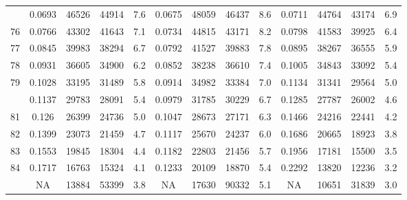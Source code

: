 \documentclass[
  14pt,
]{article}
\begin{document}
\begin{longtable}[t]{lcccccccccccc}
\addlinespace
75 & 0.0693 & 46526 & 44914 & 7.6 & 0.0675 & 48059 & 46437 & 8.6 & 0.0711 & 44764 & 43174 & 6.9\\
76 & 0.0766 & 43302 & 41643 & 7.1 & 0.0734 & 44815 & 43171 & 8.2 & 0.0798 & 41583 & 39925 & 6.4\\
77 & 0.0845 & 39983 & 38294 & 6.7 & 0.0792 & 41527 & 39883 & 7.8 & 0.0895 & 38267 & 36555 & 5.9\\
78 & 0.0931 & 36605 & 34900 & 6.2 & 0.0852 & 38238 & 36610 & 7.4 & 0.1005 & 34843 & 33092 & 5.4\\
79 & 0.1028 & 33195 & 31489 & 5.8 & 0.0914 & 34982 & 33384 & 7.0 & 0.1134 & 31341 & 29564 & 5.0\\
\addlinespace
80 & 0.1137 & 29783 & 28091 & 5.4 & 0.0979 & 31785 & 30229 & 6.7 & 0.1285 & 27787 & 26002 & 4.6\\
81 & 0.126 & 26399 & 24736 & 5.0 & 0.1047 & 28673 & 27171 & 6.3 & 0.1466 & 24216 & 22441 & 4.2\\
82 & 0.1399 & 23073 & 21459 & 4.7 & 0.1117 & 25670 & 24237 & 6.0 & 0.1686 & 20665 & 18923 & 3.8\\
83 & 0.1553 & 19845 & 18304 & 4.4 & 0.1182 & 22803 & 21456 & 5.7 & 0.1956 & 17181 & 15500 & 3.5\\
84 & 0.1717 & 16763 & 15324 & 4.1 & 0.1233 & 20109 & 18870 & 5.4 & 0.2292 & 13820 & 12236 & 3.2\\
\addlinespace
85 & NA & 13884 & 53399 & 3.8 & NA & 17630 & 90332 & 5.1 & NA & 10651 & 31839 & 3.0\\*
\end{longtable}
\end{document}
